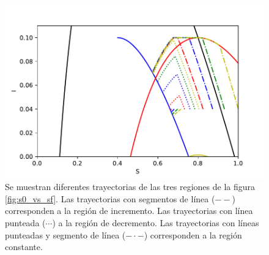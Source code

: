 \documentclass{article}
\begin{document}
\begin{figure}
\includegraphics[width = \textwidth]{short_trajectories.pdf}
\caption{Se muestran diferentes trayectorias de las tres regiones de la figura \ref{fig:s0_vs_sf}. Las trayectorias con segmentos de línea ($--$) corresponden a la región de incremento. Las trayectorias con línea punteada ($\cdots$) a la región de decremento. Las trayectorias con líneas punteadas y segmento de línea ($-\cdot-$) corresponden a la región constante.}
\label{fig:short}
\end{figure}
\end{document}
